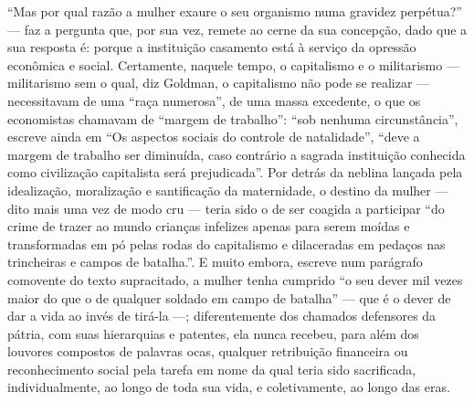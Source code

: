 ``Mas por qual razão a mulher exaure o seu organismo numa gravidez
perpétua?'' --- faz a pergunta que, por sua vez, remete ao cerne da sua
concepção, dado que a sua resposta é: porque a instituição casamento
está à serviço da opressão econômica e social. Certamente, naquele
tempo, o capitalismo e o militarismo --- militarismo sem o qual, diz
Goldman, o capitalismo não pode se realizar --- necessitavam de uma
``raça numerosa'', de uma massa excedente, o que os economistas chamavam
de ``margem de trabalho'': ``sob nenhuma circunstância'', escreve ainda
em ``Os aspectos sociais do controle de natalidade'', ``deve a margem de
trabalho ser diminuída, caso contrário a sagrada instituição conhecida
como civilização capitalista será prejudicada''. Por detrás da neblina
lançada pela idealização, moralização e santificação da maternidade, o
destino da mulher --- dito mais uma vez de modo cru --- teria sido o de
ser coagida a participar ``do crime de trazer ao mundo crianças
infelizes apenas para serem moídas e transformadas em pó pelas rodas do
capitalismo e dilaceradas em pedaços nas trincheiras e campos de
batalha.''. E muito embora, escreve num parágrafo comovente do texto
supracitado, a mulher tenha cumprido ``o seu dever mil vezes maior do
que o de qualquer soldado em campo de batalha'' --- que é o dever de dar
a vida ao invés de tirá-la ---; diferentemente dos chamados defensores da
pátria, com suas hierarquias e patentes, ela nunca recebeu, para além
dos louvores compostos de palavras ocas, qualquer retribuição financeira
ou reconhecimento social pela tarefa em nome da qual teria sido
sacrificada, individualmente, ao longo de toda sua vida, e
coletivamente, ao longo das eras.

